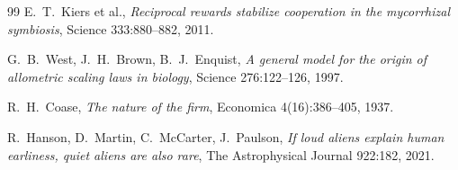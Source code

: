 \documentclass[11pt]{article}
\theoremstyle{plain}
\theoremstyle{definition}
\theoremstyle{remark}
\begin{document}
\begin{thebibliography}{99}
 E.~T.~Kiers et al., \emph{Reciprocal rewards stabilize
cooperation in the mycorrhizal symbiosis}, Science 333:880--882, 2011.

 G.~B.~West, J.~H.~Brown, B.~J.~Enquist, \emph{A general
model for the origin of allometric scaling laws in biology}, Science
276:122--126, 1997.

 R.~H.~Coase, \emph{The nature of the firm}, Economica
4(16):386--405, 1937.

 R.~Hanson, D.~Martin, C.~McCarter, J.~Paulson,
\emph{If loud aliens explain human earliness, quiet aliens are also rare},
The Astrophysical Journal 922:182, 2021.

\end{thebibliography}
\end{document}
